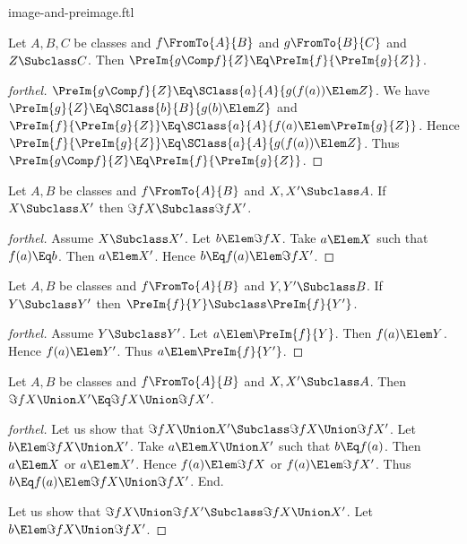 \documentclass{stex}
\begin{document}
\begin{smodule}{image-and-preimage.ftl}
\begin{proposition*}[forthel]
  Let $A, B, C$ be classes and $f \FromTo{A}{B}$ and $g \FromTo{B}{C}$ and $Z \Subclass C$.
  Then $\PreIm{g \Comp f}{Z} \Eq \PreIm{f}{\PreIm{g}{Z}}$.
\end{proposition*}
\begin{proof}[forthel]
  $\PreIm{g \Comp f}{Z} \Eq \SClass{a}{A}{g(f(a)) \Elem Z}$.
  We have $\PreIm{g}{Z} \Eq \SClass{b}{B}{g(b) \Elem Z}$ and $\PreIm{f}{\PreIm{g}{Z}} \Eq \SClass{a}{A}{f(a) \Elem \PreIm{g}{Z}}$.
  Hence $\PreIm{f}{\PreIm{g}{Z}} \Eq \SClass{a}{A}{g(f(a)) \Elem Z}$.
  Thus $\PreIm{g \Comp f}{Z} \Eq \PreIm{f}{\PreIm{g}{Z}}$.
\end{proof}

\begin{proposition*}[forthel]
  Let $A, B$ be classes and $f \FromTo{A}{B}$ and $X, X' \Subclass A$.
  If $X \Subclass X'$ then $\Im{f}{X} \Subclass \Im{f}{X'}$.
\end{proposition*}
\begin{proof}[forthel]
  Assume $X \Subclass X'$.
  Let $b \Elem \Im{f}{X}$.
  Take $a \Elem X$ such that $f(a) \Eq b$.
  Then $a \Elem X'$.
  Hence $b \Eq f(a) \Elem \Im{f}{X'}$.
\end{proof}

\begin{proposition*}[forthel]
  Let $A, B$ be classes and $f \FromTo{A}{B}$ and $Y, Y' \Subclass B$.
  If $Y \Subclass Y'$ then $\PreIm{f}{Y} \Subclass \PreIm{f}{Y'}$.
\end{proposition*}
\begin{proof}[forthel]
  Assume $Y \Subclass Y'$.
  Let $a \Elem \PreIm{f}{Y}$.
  Then $f(a) \Elem Y$.
  Hence $f(a) \Elem Y'$.
  Thus $a \Elem \PreIm{f}{Y'}$.
\end{proof}

\begin{proposition*}[forthel]
  Let $A, B$ be classes and $f \FromTo{A}{B}$ and $X, X' \Subclass A$.
  Then $\Im{f}{X \Union X'} \Eq \Im{f}{X} \Union \Im{f}{X'}$.
\end{proposition*}
\begin{proof}[forthel]
  Let us show that $\Im{f}{X \Union X'} \Subclass \Im{f}{X} \Union \Im{f}{X'}$.
    Let $b \Elem \Im{f}{X \Union X'}$.
    Take $a \Elem X \Union X'$ such that $b \Eq f(a)$.
    Then $a \Elem X$ or $a \Elem X'$.
    Hence $f(a) \Elem \Im{f}{X}$ or $f(a) \Elem \Im{f}{X'}$.
    Thus $b \Eq f(a) \Elem \Im{f}{X} \Union \Im{f}{X'}$.
  End.

  Let us show that $\Im{f}{X} \Union \Im{f}{X'} \Subclass \Im{f}{X \Union X'}$.
    Let $b \Elem \Im{f}{X} \Union \Im{f}{X'}$.


\end{proof}
\end{smodule}
\end{document}
